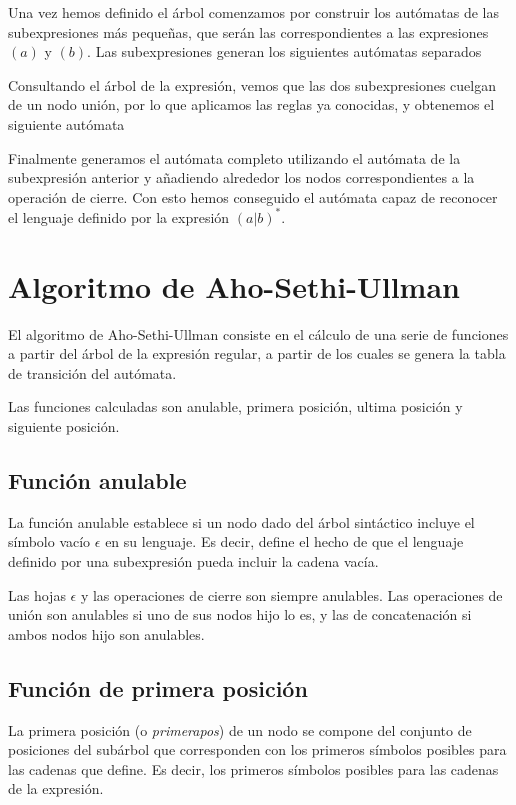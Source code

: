 
Una vez hemos definido el árbol comenzamos por construir los autómatas de las subexpresiones más pequeñas, que serán las correspondientes a las expresiones $(a)$ y $(b)$.
Las subexpresiones generan los siguientes autómatas separados


Consultando el árbol de la expresión, vemos que las dos subexpresiones cuelgan de un nodo unión, por lo que aplicamos las reglas ya conocidas, y obtenemos el siguiente autómata


Finalmente generamos el autómata completo utilizando el autómata de la subexpresión anterior y añadiendo alrededor los nodos correspondientes a la operación de cierre.
Con esto hemos conseguido el autómata capaz de reconocer el lenguaje definido por la expresión $(a|b)^*$.


\section{Algoritmo de Aho-Sethi-Ullman}
El algoritmo de Aho-Sethi-Ullman \cite{dragon} \cite{5221603} consiste en el cálculo de una serie de funciones a partir del árbol de la expresión regular, a partir de los cuales se genera la tabla de transición del autómata.

Las funciones calculadas son anulable, primera posición, ultima posición y siguiente posición.

\subsection{Función anulable}
La función anulable establece si un nodo dado del árbol sintáctico incluye el símbolo vacío $ \epsilon $ en su lenguaje.
Es decir, define el hecho de que el lenguaje definido por una subexpresión pueda incluir la cadena vacía.

Las hojas $ \epsilon $ y las operaciones de cierre son siempre anulables.
Las operaciones de unión son anulables si uno de sus nodos hijo lo es, y las de concatenación si ambos nodos hijo son anulables.

\subsection{Función de primera posición}
La primera posición (o \emph{primerapos}) de un nodo se compone del conjunto de posiciones del subárbol que corresponden con los primeros símbolos posibles para las cadenas que define.
Es decir, los primeros símbolos posibles para las cadenas de la expresión.

